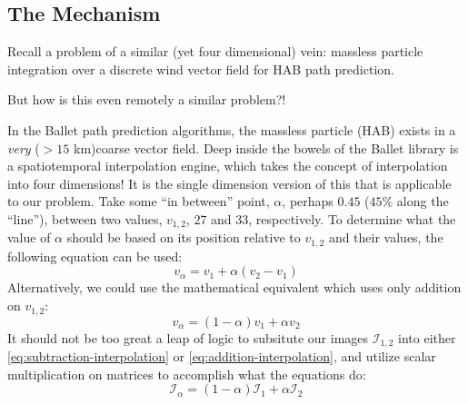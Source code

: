 \documentclass[a4paper]{article}
\begin{document}
\subsection{The Mechanism} Recall a problem of a similar (yet four dimensional) vein: massless particle integration over a discrete wind vector field for HAB path prediction.\\
\par\noindent But how is this even remotely a similar problem?!\\
\par\noindent In the Ballet path prediction algorithms, the massless particle (HAB) exists in a \textit{very} ($>15$ km)coarse vector field. Deep inside the bowels of the Ballet library is a spatiotemporal interpolation engine, which takes the concept of interpolation into four dimensions! It is the single dimension version of this that is applicable to our problem. Take some ``in between'' point, $\alpha$, perhaps $0.45$ ($45$\% along the ``line''), between two values, $v_{1,2}$, $27$ and $33$, respectively. To determine what the value of $\alpha$ should be based on its position relative to $v_{1,2}$ and their values, the following equation can be used:
\begin{equation}\label{eq:subtraction-interpolation}
  v_{\alpha} = v_{1} + \alpha\left(v_{2} - v_{1}\right)
\end{equation}
Alternatively, we could use the mathematical equivalent which uses only addition on $v_{1,2}$:
\begin{equation}\label{eq:addition-interpolation}
  v_{\alpha} = (1-\alpha)v_{1}+\alpha v_{2}
\end{equation}
It should not be too great a leap of logic to subsitute our images $\mathcal{I}_{1,2}$ into either \ref{eq:subtraction-interpolation} or \ref{eq:addition-interpolation}, and utilize scalar multiplication on matrices to accomplish what the equations do:
\begin{equation}
  \mathcal{I}_{\alpha}=\left(1-\alpha\right)\mathcal{I}_{1}+\alpha\mathcal{I}_{2}
\end{equation}




\end{document}
